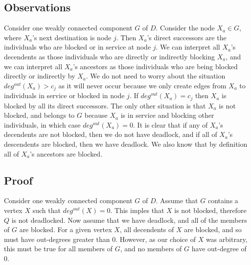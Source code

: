 \documentclass{article}
\begin{document}
\subsection*{Observations}
Consider one weakly connected component $G$ of $D$. Consider the node $X_a \in G$, where $X_a$'s next destination is node $j$. Then $X_a$'s direct successors are the individuals who are blocked or in service at node $j$. We can interpret all $X_a$'s decendents as those individuals who are directly or indirectly blocking $X_a$, and we can interpret all $X_a$'s ancestors as those individuals who are being blocked directly or indirectly by $X_a$.\newline
We do not need to worry about the situation $deg^{out}(X_a) > c_j$ as it will never occur because we only create edges from $X_a$ to individuals in service or blocked in node $j$. If $deg^{out}(X_a) = c_j$ then $X_a$ is blocked by all its direct successors. The only other situation is that $X_a$ is not blocked, and belongs to $G$ because $X_a$ is in service and blocking other individuals, in which case $deg^{out}(X_a) = 0$.\newline
It is clear that if any of $X_a$'s decendents are not blocked, then we do not have deadlock, and if all of $X_a$'s descendents are blocked, then we have deadlock. We also know that by definition all of $X_a$'s ancestors are blocked.\newline

\subsection*{Proof}
Consider one weakly connected component $G$ of $D$.\newline
Assume that $G$ contains a vertex $X$ such that $deg^{out}(X) = 0$. This imples that $X$ is not blocked, therefore $Q$ is not deadlocked.\newline
Now assume that we have deadlock, and all of the members of $G$ are blocked. For a given vertex $X$, all decendents of $X$ are blocked, and so must have out-degrees greater than 0. However, as our choice of $X$ was arbitrary, this must be true for all members of $G$, and no members of $G$ have out-degree of 0.\newline



\end{document}
